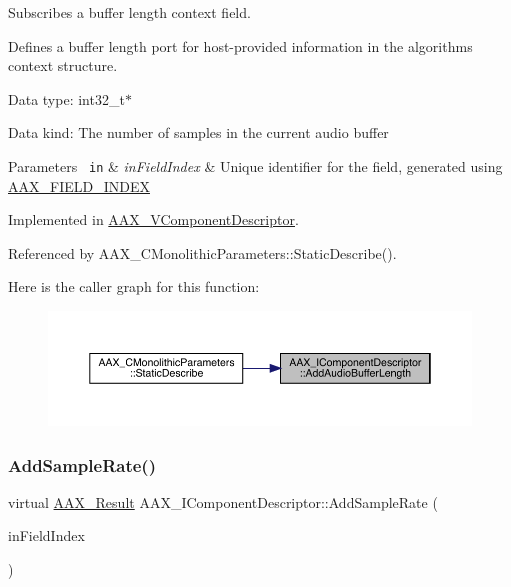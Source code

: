 Subscribes a buffer length context field. 

Defines a buffer length port for host-\/provided information in the algorithm\textquotesingle{}s context structure.


\begin{DoxyItemize}
\item Data type\+: int32\+\_\+t$\ast$
\item Data kind\+: The number of samples in the current audio buffer
\end{DoxyItemize}


\begin{DoxyParams}[1]{Parameters}
\mbox{\texttt{ in}}  & {\em in\+Field\+Index} & Unique identifier for the field, generated using \mbox{\hyperlink{a00392_acf807247ecd6e5899dc9dc31644e9a1d}{A\+A\+X\+\_\+\+F\+I\+E\+L\+D\+\_\+\+I\+N\+D\+EX}} \\
\hline
\end{DoxyParams}


Implemented in \mbox{\hyperlink{a01901_ae7bc664b4079cb46ca268e983821461d}{A\+A\+X\+\_\+\+V\+Component\+Descriptor}}.



Referenced by A\+A\+X\+\_\+\+C\+Monolithic\+Parameters\+::\+Static\+Describe().

Here is the caller graph for this function\+:
\nopagebreak
\begin{figure}[H]
\begin{center}
\leavevmode
\includegraphics[width=350pt]{a01781_a55d6cdb4a9c860c9ed4cb685e346f0dc_icgraph}
\end{center}
\end{figure}
\mbox{\label{a01781_adbd57beaa0a3143d3cf44b93ecdb59ec}} 
\subsubsection{\texorpdfstring{AddSampleRate()}{AddSampleRate()}}
{\footnotesize\ttfamily virtual \mbox{\hyperlink{a00392_a4d8f69a697df7f70c3a8e9b8ee130d2f}{A\+A\+X\+\_\+\+Result}} A\+A\+X\+\_\+\+I\+Component\+Descriptor\+::\+Add\+Sample\+Rate (\begin{DoxyParamCaption}\item[{\mbox{\hyperlink{a00392_ae807f8986143820cfb5d6da32165c9c7}{A\+A\+X\+\_\+\+C\+Field\+Index}}}]{in\+Field\+Index }\end{DoxyParamCaption})\hspace{0.3cm}{\ttfamily [pure virtual]}}



